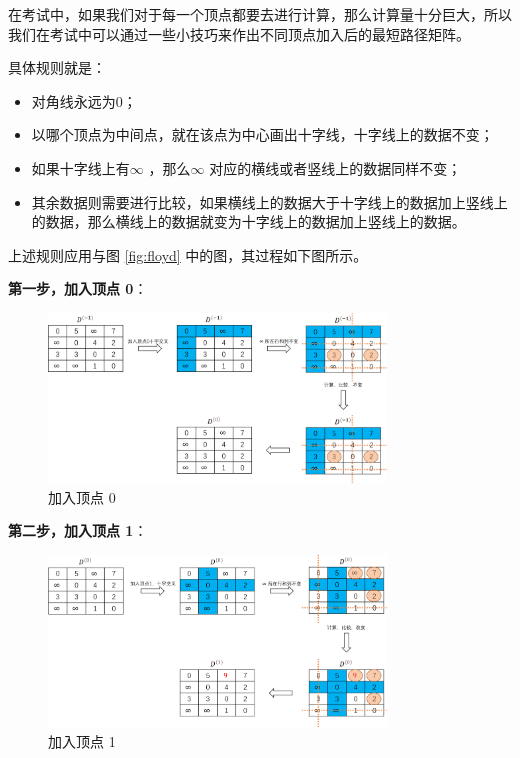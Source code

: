\documentclass[lang=cn,newtx,10pt,scheme=chinese]{../elegantbook}
\begin{document}
在考试中，如果我们对于每一个顶点都要去进行计算，那么计算量十分巨大，所以我们在考试中可以通过一些小技巧来作出不同顶点加入后的最短路径矩阵。

具体规则就是：

\begin{itemize}
  \item 对角线永远为0；
  \item 以哪个顶点为中间点，就在该点为中心画出十字线，十字线上的数据不变；
  \item 如果十字线上有$\infty$ ，那么$\infty$ 对应的横线或者竖线上的数据同样不变；
  \item 其余数据则需要进行比较，如果横线上的数据大于十字线上的数据加上竖线上的数据，那么横线上的数据就变为十字线上的数据加上竖线上的数据。
\end{itemize}


上述规则应用与图 \ref{fig:floyd} 中的图，其过程如下图所示。

\textbf{第一步，加入顶点 0}：

\begin{figure}[!htbp]
  \centering
  \includegraphics[width=0.8\textwidth]{./figure/pdf/cropped/floyd_addNum0.pdf}
  \caption{加入顶点 0}
  \label{fig:floyd_0}
\end{figure}

\textbf{第二步，加入顶点 1}：

\begin{figure}[!htbp]
  \centering
  \includegraphics[width=0.8\textwidth]{./figure/pdf/cropped/floyd_addNum1.pdf}
  \caption{加入顶点 1}
  \label{fig:floyd_1}

\end{figure}
\end{document}
